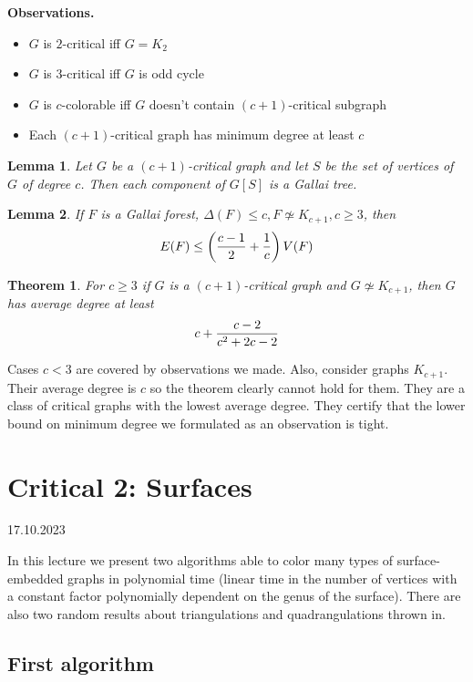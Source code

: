\documentclass{article}
\newtheorem*{theorem}{Theorem}
\newtheorem*{lemma}{Lemma}
\begin{document}
\noindent
\textbf{Observations.}
\begin{itemize}
	\item $G$ is $2$-critical iff $G = K_2$
	\item $G$ is $3$-critical iff $G$ is odd cycle
	\item $G$ is $c$-colorable iff $G$ doesn't contain $(c+1)$-critical
		subgraph
	\item Each $(c+1)$-critical graph has minimum degree at least $c$
\end{itemize}

\begin{lemma}
	Let $G$ be a $(c+1)$-critical graph and let $S$ be the set of vertices
	of $G$ of degree $c$. Then each component of $G[S]$ is a Gallai tree.
\end{lemma}

\begin{lemma}
	If $F$ is a Gallai forest, $\Delta(F) \le c, F \not \simeq K_{c+1}, c
	\ge 3$, then
	$$ E(F) \le \left ({{c-1}\over2} + {1 \over c} \right ) V(F) $$
\end{lemma}

\begin{theorem}
	For $c \ge 3$ if $G$ is a $(c+1)$-critical graph and $G \not \simeq
	K_{c+1}$, then $G$ has average degree at least
	$$ c + {{c-2}\over{c^2 + 2c - 2}} $$
\end{theorem}

\noindent
Cases $c < 3$ are covered by observations we made. Also, consider graphs
$K_{c+1}$. Their average degree is $c$ so the theorem clearly cannot hold for
them. They are a class of critical graphs with the lowest average degree. They
certify that the lower bound on minimum degree we formulated as an observation
is tight.


\newpage
\section{Critical 2: Surfaces} %
17.10.2023

\noindent
In this lecture we present two algorithms able to color many types of
surface-embedded graphs in polynomial time (linear time in the number of
vertices with a constant factor polynomially dependent on the genus of the
surface). There are also two random results about triangulations and
quadrangulations thrown in.

\subsection*{First algorithm}
\end{document}
